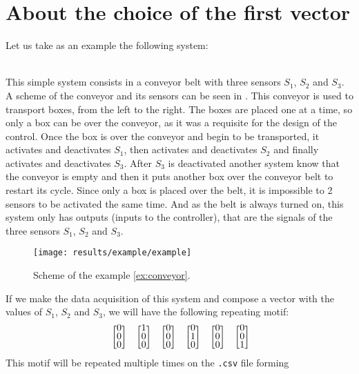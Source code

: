 \section{About the choice of the first vector}
Let us take as an example the following system: 
\begin{example}~\\
  \label{ex:conveyor}
 This simple system consists in a conveyor belt with three sensors $S_1$, $S_2$ and
 $S_3$. A scheme of the conveyor and its sensors can be seen in
 . This conveyor is used to transport boxes, from
 the left to the right.  The boxes are placed one at a time, so only a box can be
 over the conveyor, as it was a requisite for the design of the control. Once the box is over
 the conveyor and begin to be transported, it activates and deactivates $S_1$,
 then activates and deactivates $S_2$ and
 finally activates and deactivates $S_3$. After $S_3$ is deactivated another
 system know that the conveyor is empty and then it puts another box over the
 conveyor belt to restart its cycle. Since only a box is placed over the belt,
 it is impossible to 2 sensors to be activated the same time. And as the belt is always turned on, this system
 only has outputs (inputs to the controller), that are the signals of the three sensors $S_1$, $S_2$ and
 $S_3$.
\end{example}
\begin{figure}[H]
  \centering
  \texttt{[image: results/example/example]}
  \caption{Scheme of the example \ref{ex:conveyor}.}
    \label{fig:schemeExConveyor}
\end{figure}
If we make the data acquisition of this system and compose a vector with the
values of $S_1$, $S_2$ and $S_3$, we will have the following repeating motif:
\begin{align}
  \label{motif}
\colvec{0\\0\\0}\colvec{1\\0\\0}\colvec{0\\0\\0}\colvec{0\\1\\0}\colvec{0\\0\\0}\colvec{0\\0\\1}
\end{align}
This motif will be repeated multiple times on the \verb|.csv| file forming
